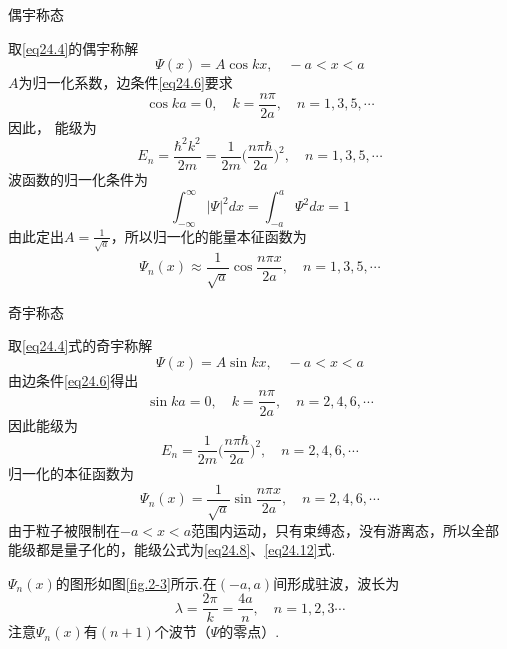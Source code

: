 {\heiti 偶宇称态}

取\eqref{eq24.4}的偶宇称解
\begin{equation*}
	\varPsi(x)=A\cos kx,\quad -a<x<a
\end{equation*}
$A$为归一化系数，边条件\eqref{eq24.6}要求
\begin{equation}\label{eq24.7}
	\cos ka=0,\quad k=\frac{n\pi}{2a},\quad n=1,3,5,\cdots
\end{equation}
因此， 能级为
\begin{equation}\label{eq24.8}
	E_{n}=\frac{\hbar^{2}k^{2}}{2m}=\frac{1}{2m}\bigg(\frac{n\pi\hbar}{2a}\bigg)^{2},\quad
	n=1,3,5,\cdots
\end{equation}
波函数的归一化条件为
\begin{equation}\label{eq24.9}
	\int_{-\infty}^{\infty} |\varPsi|^{2}dx=\int_{-a}^{a} \varPsi^{2}dx=1
\end{equation}
由此定出$A=\frac{1}{\sqrt{a}}$，所以归一化的能量本征函数为
\begin{equation}\label{eq24.10}
	\varPsi_{n}(x)\approx \frac{1}{\sqrt{a}}\cos\frac{n\pi x}{2a},\quad n=1,3,5,\cdots
\end{equation}

{\heiti 奇宇称态}

取\eqref{eq24.4}式的奇宇称解
\begin{equation*}
	\varPsi(x)=A\sin kx,\quad -a<x<a
\end{equation*}
由边条件\eqref{eq24.6}得出
\begin{equation}\label{eq24.11}
	\sin ka=0,\quad k=\frac{n\pi}{2a},\quad n=2,4,6,\cdots
\end{equation}
因此能级为
\begin{equation}\label{eq24.12}
	E_{n}=\frac{1}{2m}\bigg(\frac{n\pi\hbar}{2a} \bigg)^{2},\quad n=2,4,6,\cdots
\end{equation}
归一化的本征函数为
\begin{equation}\label{eq24.13}
	\varPsi_{n}(x)=\frac{1}{\sqrt{a}}\sin\frac{n\pi x}{2a},\quad n=2,4,6,\cdots
\end{equation}
由于粒子被限制在$-a<x<a$范围内运动，只有束缚态，没有游离态，所以全部能级都是量子化的，能级公式为\eqref{eq24.8}、\eqref{eq24.12}式.

$\varPsi_{n}(x)$的图形如图\ref{fig.2-3}所示.在$(-a,a)$间形成驻波，波长为
\begin{equation}\label{eq24.14}
	\lambda=\frac{2\pi}{k}=\frac{4a}{n},\quad n=1,2,3\cdots
\end{equation}
注意$\varPsi_{n}(x)$有$(n + 1)$个波节（$\varPsi$的零点）.

